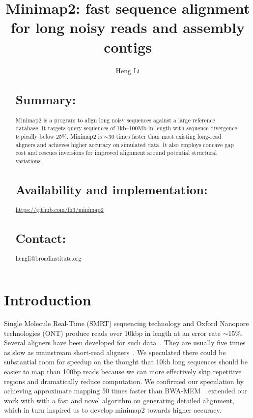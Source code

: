 \documentclass{bioinfo}
\begin{document}

\title[Long-read and assembly alignment with minimap2]{Minimap2: fast sequence alignment for long noisy reads and assembly contigs}
\author[Li]{Heng Li}
\address{Broad Institute, 415 Main Street, Cambridge, MA 02142, USA}

\maketitle

\begin{abstract}
\section{Summary:} Minimap2 is a program to align long noisy sequences against
a large reference database. It targets query sequences of 1kb--100Mb in length
with sequence divergence typically below 25\%. Minimap2 is $\sim$30 times
faster than most existing long-read aligners and achieves higher accuracy on
simulated data. It also employs concave gap cost and rescues inversions for
improved alignment around potential structural variations.

\section{Availability and implementation:}
\href{https://github.com/lh3/minimap2}{https://github.com/lh3/minimap2}

\section{Contact:} hengli@broadinstitute.org
\end{abstract}

\section{Introduction}

Single Molecule Real-Time (SMRT) sequencing technology and Oxford Nanopore
technologies (ONT) produce reads over 10kbp in length at an error rate
$\sim$15\%. Several aligners have been developed for such
data~\citep{Chaisson:2012aa,Li:2013aa,Liu:2016ab,Sovic:2016aa,Liu:2017aa,Lin:2017aa,Sedlazeck169557}.
They are usually five times as slow as mainstream short-read
aligners~\citep{Langmead:2012fk,Li:2013aa}. We speculated there could be
substantial room for speedup on the thought that 10kb long sequences should be
easier to map than 100bp reads because we can more effectively skip repetitive
regions and dramatically reduce computation. We confirmed our speculation by
achieving approximate mapping 50 times faster than BWA-MEM~\citep{Li:2016aa}.
\citet{Suzuki:2016} extended our work with with a fast and novel algorithm on
generating detailed alignment, which in turn inspired us to develop minimap2
towards higher accuracy.
\end{document}
